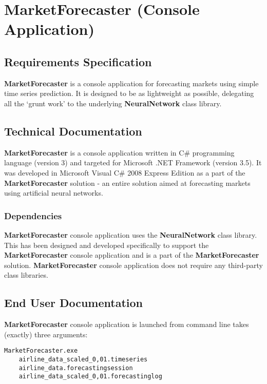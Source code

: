 \chapter{MarketForecaster (Console Application)}

\section{Requirements Specification}

\textbf{MarketForecaster} is a console application for forecasting markets using simple time series prediction. It is designed to be as lightweight as possible, delegating all the `grunt work' to the underlying \textbf{NeuralNetwork} class library.

\section{Technical Documentation}

\textbf{MarketForecaster} is a console application written in C\# programming language (version 3) and targeted for Microsoft .NET Framework (version 3.5). It was developed in Microsoft Visual C\# 2008 Express Edition as a part of the \textbf{MarketForecaster} solution - an entire solution aimed at forecasting markets using artificial neural networks.

\subsection{Dependencies}

\textbf{MarketForecaster} console application uses the \textbf{NeuralNetwork} class library. This has been designed and developed specifically to support the \textbf{MarketForecaster} console application and is a part of the \textbf{MarketForecaster} solution. \textbf{MarketForecaster} console application does not require any third-party class libraries.

\section{End User Documentation}

\textbf{MarketForecaster} console application is launched from command line takes (exactly) three arguments:

\medskip

\begin{verbatim}
MarketForecaster.exe
    airline_data_scaled_0,01.timeseries
    airline_data.forecastingsession
    airline_data_scaled_0,01.forecastinglog
\end{verbatim}

